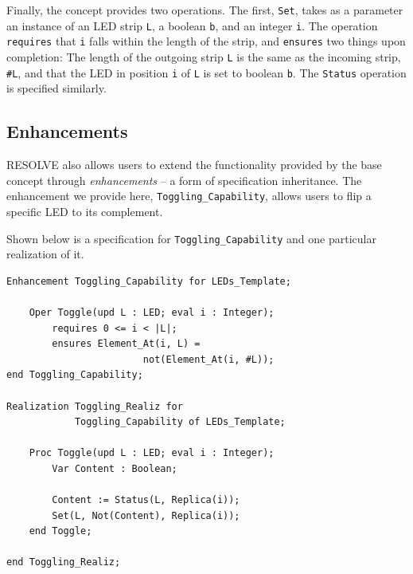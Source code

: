 \documentclass{sig-alternate}
\begin{document}
Finally, the concept provides two operations. The first, \texttt{Set}, takes as a parameter an instance of an LED strip \texttt{L}, a boolean \texttt{b}, and an integer \texttt{i}. The operation \texttt{requires} that \texttt{i} falls within the length of the strip, and \texttt{ensures} two things upon completion: The length of the outgoing strip \texttt{L} is the same as the incoming strip, \texttt{\#L}, and that the LED in position \texttt{i} of \texttt{L} is set to boolean \texttt{b}. The \texttt{Status} operation is specified similarly. 


\subsection{Enhancements}

RESOLVE also allows users to extend the functionality provided by the base concept through \textit{enhancements} -- a form of specification inheritance. The enhancement we provide here, \texttt{Toggling\_Capability}, allows users to flip a specific LED to its complement.

Shown below is a specification for \texttt{Toggling\_Capability} and one particular realization of it.

\begin{verbatim}
Enhancement Toggling_Capability for LEDs_Template;

    Oper Toggle(upd L : LED; eval i : Integer);
        requires 0 <= i < |L|;
        ensures Element_At(i, L) = 
                        not(Element_At(i, #L));
end Toggling_Capability;

Realization Toggling_Realiz for
            Toggling_Capability of LEDs_Template;

    Proc Toggle(upd L : LED; eval i : Integer);
        Var Content : Boolean;
        
        Content := Status(L, Replica(i));
        Set(L, Not(Content), Replica(i));
    end Toggle;
    
end Toggling_Realiz;
\end{verbatim}
\end{document}
